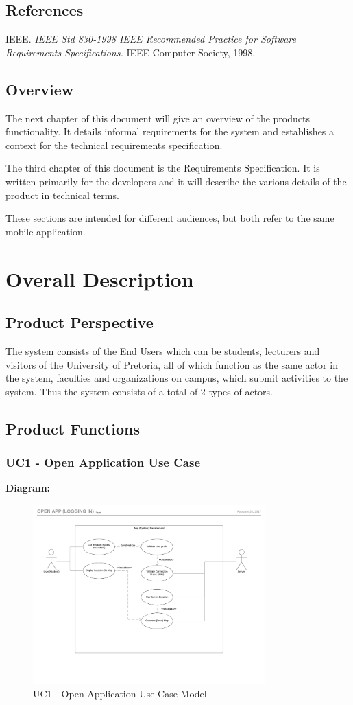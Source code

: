 \documentclass[a4paper, 12pt, one column, aas_macros]{article}
\begin{document}
\subsection{References}
IEEE. \textit{IEEE Std 830-1998 IEEE Recommended Practice for Software Requirements Specifications.} IEEE Computer Society, 1998.

\subsection{Overview}
The next chapter of this document will give an overview of the products functionality. It details informal requirements for the system and  establishes a context for the technical requirements specification.

The third chapter of this document is the Requirements Specification. It is written primarily for the developers and it will describe the various details of the product in technical terms.

These sections are intended for different audiences, but both refer to the same mobile application.

\section{Overall Description}

\subsection{Product Perspective}
The system consists of the End Users which can be students, lecturers and visitors of the University of Pretoria, all of which function as the same actor in the system, faculties and organizations on campus, which submit activities to the system. Thus the system consists of a total of 2 types of actors.
\newpage
\subsection{Product Functions}
\subsubsection{UC1 - Open Application Use Case}
\textbf{Diagram:}
\begin{figure}[H]
\centering
\includegraphics[width=0.8\textwidth]{App_Log_In_Use-Case.pdf}
\caption{UC1 - Open Application Use Case Model}
\end{figure}
\end{document}
